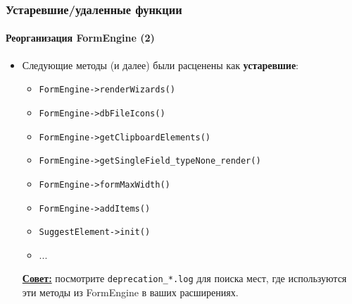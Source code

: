 
\begin{frame}[fragile]
	\frametitle{Устаревшие/удаленные функции}
	\framesubtitle{Реорганизация FormEngine (2)}

	\begin{itemize}

		\item Следующие методы (и далее) были расценены как \textbf{устаревшие}:

			\begin{itemize}
				\item \texttt{FormEngine->renderWizards()}
				\item \texttt{FormEngine->dbFileIcons()}
				\item \texttt{FormEngine->getClipboardElements()}
				\item \texttt{FormEngine->getSingleField\_typeNone\_render()}
				\item \texttt{FormEngine->formMaxWidth()}
				\item \texttt{FormEngine->addItems()}
				\item \texttt{SuggestElement->init()}
				\item ...
			\end{itemize}

		\small
			\underline{\textbf{Совет:}}
			посмотрите \texttt{deprecation\_*.log} для поиска мест, где используются эти методы из FormEngine
			в ваших расширениях.
		\normalsize

	\end{itemize}

\end{frame}


